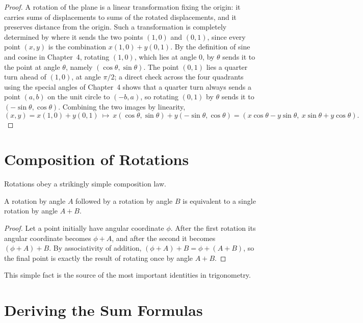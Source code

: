 \begin{proof}
A rotation of the plane is a linear transformation fixing the origin: it
carries sums of displacements to sums of the rotated displacements, and it
preserves distance from the origin. Such a transformation is completely
determined by where it sends the two points $(1,0)$ and $(0,1)$, since
every point $(x,y)$ is the combination $x(1,0) + y(0,1)$. By the
definition of sine and cosine in Chapter~4, rotating $(1,0)$, which lies at
angle $0$, by $\theta$ sends it to the point at angle $\theta$, namely
$(\cos\theta, \sin\theta)$. The point $(0,1)$ lies a quarter turn ahead of
$(1,0)$, at angle $\pi/2$; a direct check across the four quadrants using
the special angles of Chapter~4 shows that a quarter turn always sends a
point $(a,b)$ on the unit circle to $(-b,a)$, so rotating $(0,1)$ by
$\theta$ sends it to $(-\sin\theta, \cos\theta)$. Combining the two images
by linearity,
\[
(x,y) = x(1,0) + y(0,1) \ \longmapsto\ x(\cos\theta,\sin\theta) +
y(-\sin\theta,\cos\theta) = (x\cos\theta - y\sin\theta,\ x\sin\theta +
y\cos\theta).
\]
\end{proof}

\section{Composition of Rotations}

Rotations obey a strikingly simple composition law.

\begin{theorem}
A rotation by angle $A$ followed by a rotation by angle $B$ is equivalent
to a single rotation by angle $A+B$.
\end{theorem}

\begin{proof}
Let a point initially have angular coordinate $\phi$. After the first
rotation its angular coordinate becomes $\phi + A$, and after the second
it becomes $(\phi + A) + B$. By associativity of addition, $(\phi+A)+B =
\phi + (A+B)$, so the final point is exactly the result of rotating once by
angle $A+B$.
\end{proof}

This simple fact is the source of the most important identities in
trigonometry.

\section{Deriving the Sum Formulas}

